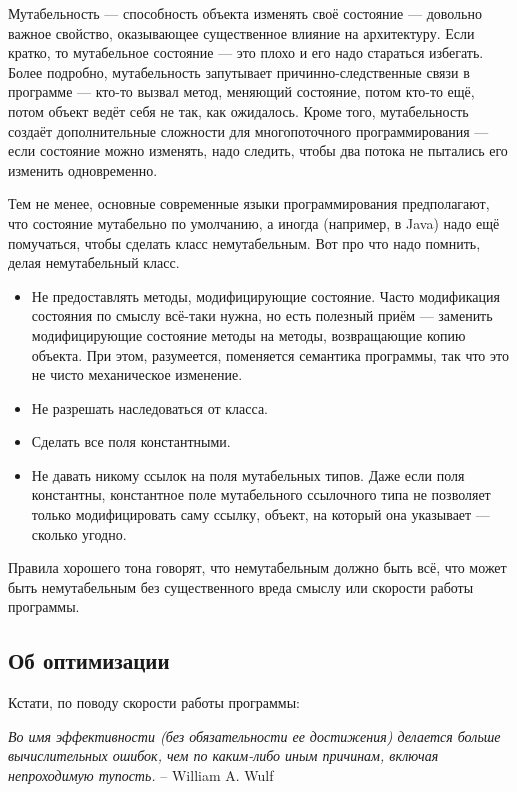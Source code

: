 \documentclass{../../text-style}
\begin{document}
Мутабельность --- способность объекта изменять своё состояние --- довольно важное свойство, оказывающее существенное влияние на архитектуру. Если кратко, то мутабельное состояние --- это плохо и его надо стараться избегать. Более подробно, мутабельность запутывает причинно-следственные связи в программе --- кто-то вызвал метод, меняющий состояние, потом кто-то ещё, потом объект ведёт себя не так, как ожидалось. Кроме того, мутабельность создаёт дополнительные сложности для многопоточного программирования --- если состояние можно изменять, надо следить, чтобы два потока не пытались его изменить одновременно.

Тем не менее, основные современные языки программирования предполагают, что состояние мутабельно по умолчанию, а иногда (например, в Java) надо ещё помучаться, чтобы сделать класс немутабельным. Вот про что надо помнить, делая немутабельный класс.

\begin{itemize}
	\item Не предоставлять методы, модифицирующие состояние. Часто модификация состояния по смыслу всё-таки нужна, но есть полезный приём --- заменить модифицирующие состояние методы на методы, возвращающие копию объекта. При этом, разумеется, поменяется семантика программы, так что это не чисто механическое изменение.
	\item Не разрешать наследоваться от класса.
	\item Сделать все поля константными.
	\item Не давать никому ссылок на поля мутабельных типов. Даже если поля константны, константное поле мутабельного ссылочного типа не позволяет только модифицировать саму ссылку, объект, на который она указывает --- сколько угодно.
\end{itemize}

Правила хорошего тона говорят, что немутабельным должно быть всё, что может быть немутабельным без существенного вреда смыслу или скорости работы программы.

\subsection{Об оптимизации}

Кстати, по поводу скорости работы программы:

\textit{Во имя эффективности (без обязательности ее достижения) делается больше вычислительных ошибок, чем по каким-либо иным причинам, включая непроходимую тупость.} \newline
-- William A. Wulf 
\end{document}
